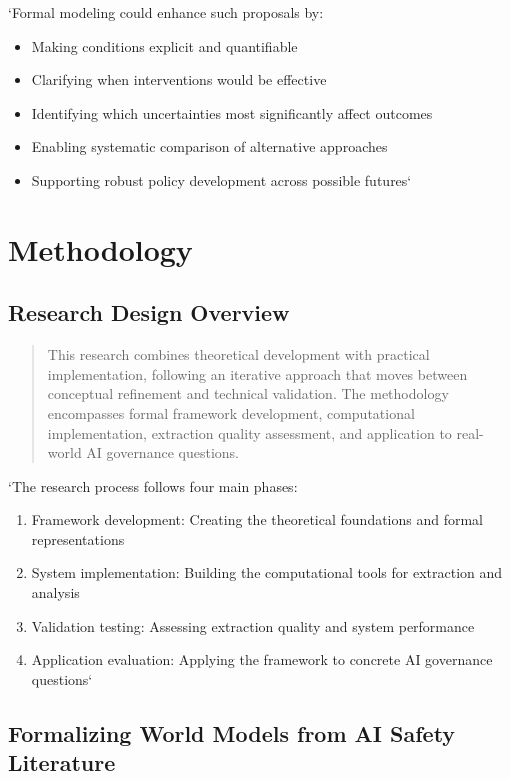 \documentclass[]{book}
\providecommand{\tightlist}{%
  \setlength{\itemsep}{0pt}\setlength{\parskip}{0pt}}
\begin{document}
`Formal modeling could enhance such proposals by:

\begin{itemize}
\tightlist
\item
  Making conditions explicit and quantifiable
\item
  Clarifying when interventions would be effective
\item
  Identifying which uncertainties most significantly affect outcomes
\item
  Enabling systematic comparison of alternative approaches
\item
  Supporting robust policy development across possible futures`
\end{itemize}

\section{Methodology}\label{sec-methodology}

\subsection{Research Design Overview}\label{sec-research-design}

\begin{quote}
This research combines theoretical development with practical
implementation, following an iterative approach that moves between
conceptual refinement and technical validation. The methodology
encompasses formal framework development, computational implementation,
extraction quality assessment, and application to real-world AI
governance questions.
\end{quote}

`The research process follows four main phases:

\begin{enumerate}
\def\labelenumi{\arabic{enumi}.}
\tightlist
\item
  Framework development: Creating the theoretical foundations and formal
  representations
\item
  System implementation: Building the computational tools for extraction
  and analysis
\item
  Validation testing: Assessing extraction quality and system
  performance
\item
  Application evaluation: Applying the framework to concrete AI
  governance questions`
\end{enumerate}

\subsection{Formalizing World Models from AI Safety
Literature}\label{sec-formalizing-world-models}
\end{document}
